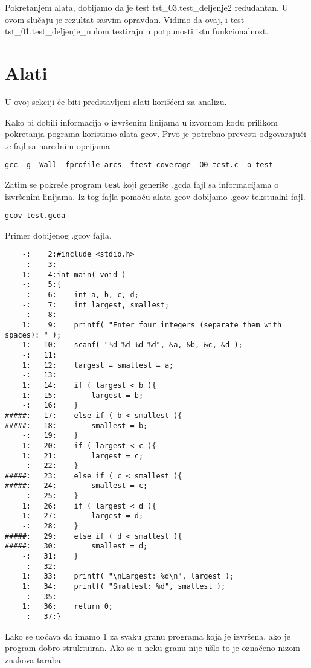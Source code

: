 \documentclass[a4paper]{article}
\begin{document}
Pokretanjem alata, dobijamo da je test tst\_03.test\_deljenje2 redudantan. U ovom slučaju je rezultat sasvim opravdan. Vidimo da ovaj, i test tst\_01.test\_deljenje\_nulom testiraju u potpunosti istu funkcionalnost.

\section{Alati}
\label{sec:tools}

U ovoj sekciji će biti predstavljeni alati korišćeni za analizu.

Kako bi dobili informacija o izvršenim linijama u izvornom kodu prilikom pokretanja pograma koristimo alata gcov. Prvo je potrebno prevesti odgovarajući .c fajl sa narednim opcijama

\begin{verbatim}
gcc -g -Wall -fprofile-arcs -ftest-coverage -O0 test.c -o test
\end{verbatim}

Zatim se pokreće program \textbf{test} koji generiše .gcda fajl sa informacijama o izvršenim linijama. Iz tog fajla pomoću alata gcov dobijamo .gcov tekstualni fajl.

\begin{verbatim}
gcov test.gcda
\end{verbatim}

Primer dobijenog .gcov fajla.
\begin{lstlisting}
	-:    2:#include <stdio.h>
	-:    3:
	1:    4:int main( void )
	-:    5:{   
	-:    6:    int a, b, c, d;
	-:    7:    int largest, smallest;
	-:    8:
	1:    9:    printf( "Enter four integers (separate them with spaces): " );
	1:   10:    scanf( "%d %d %d %d", &a, &b, &c, &d );
	-:   11:
	1:   12:    largest = smallest = a;
	-:   13:
	1:   14:    if ( largest < b ){
	1:   15:        largest = b;
	-:   16:    }
#####:   17:    else if ( b < smallest ){
#####:   18:        smallest = b;
	-:   19:    }
	1:   20:    if ( largest < c ){
	1:   21:        largest = c;
	-:   22:    }
#####:   23:    else if ( c < smallest ){
#####:   24:        smallest = c;
	-:   25:    }
	1:   26:    if ( largest < d ){
	1:   27:        largest = d;
	-:   28:    }
#####:   29:    else if ( d < smallest ){
#####:   30:        smallest = d;
	-:   31:    }
	-:   32:
	1:   33:    printf( "\nLargest: %d\n", largest );
	1:   34:    printf( "Smallest: %d", smallest );
	-:   35:
	1:   36:    return 0;
	-:   37:}
\end{lstlisting}

Lako se uočava da imamo 1 za svaku granu programa koja je izvršena, ako je program dobro struktuiran. Ako se u neku granu nije ušlo to je označeno nizom znakova taraba. 
\end{document}
